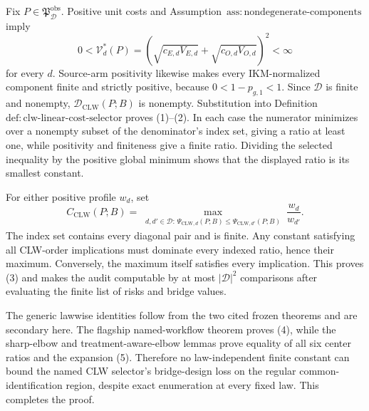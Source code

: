 Fix \(P\in\mathfrak P_{\mathcal D}^{\mathrm{obs}}\). Positive unit costs and Assumption~\(\mathrm{ass{:}nondegenerate\text{-}components}\) imply
\[
 0<\mathcal V_d^*(P)
 =\left(\sqrt{c_{E,d}V_{E,d}}+\sqrt{c_{O,d}V_{O,d}}\right)^2
 <\infty
\]
for every \(d\). Source-arm positivity likewise makes every IKM-normalized component finite and strictly positive, because \(0<1-p_{g,1}<1\). Since \(\mathcal D\) is finite and nonempty, \(\mathcal D_{\mathrm{CLW}}(P;B)\) is nonempty. Substitution into Definition~\(\mathrm{def{:}clw\text{-}linear\text{-}cost\text{-}selector}\) proves (1)--(2). In each case the numerator minimizes over a nonempty subset of the denominator's index set, giving a ratio at least one, while positivity and finiteness give a finite ratio. Dividing the selected inequality by the positive global minimum shows that the displayed ratio is its smallest constant.

For either positive profile \(w_d\), set
\[
 C_{\mathrm{CLW}}(P;B)
 =\max_{\substack{d,d'\in\mathcal D:\,
 \Psi_{\mathrm{CLW},d}(P;B)\le\Psi_{\mathrm{CLW},d'}(P;B)}}
 \frac{w_d}{w_{d'}}.
\]
The index set contains every diagonal pair and is finite. Any constant satisfying all CLW-order implications must dominate every indexed ratio, hence their maximum. Conversely, the maximum itself satisfies every implication. This proves (3) and makes the audit computable by at most \(|\mathcal D|^2\) comparisons after evaluating the finite list of risks and bridge values.

The generic lawwise identities follow from the two cited frozen theorems and are secondary here. The flagship named-workflow theorem proves (4), while the sharp-elbow and treatment-aware-elbow lemmas prove equality of all six center ratios and the expansion (5). Therefore no law-independent finite constant can bound the named CLW selector's bridge-design loss on the regular common-identification region, despite exact enumeration at every fixed law. This completes the proof.